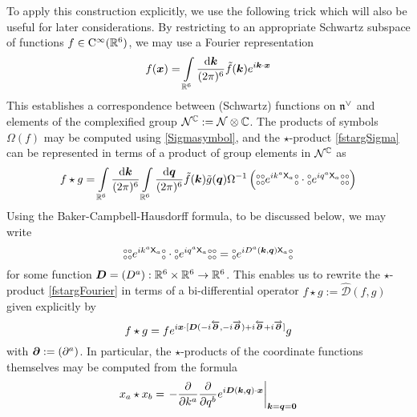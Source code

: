 To apply this construction explicitly, we use the following trick
\cite{MSSW1,BehrSyk1} which will also be useful for later considerations. By
restricting to an appropriate Schwartz subspace of functions
$f\in{\rm C}^\infty({\mathbb R}^6)$, we may use a Fourier representation
\begin{equation}
  \label{Fouriertransfdef}
  f(\mx)=\int\limits_{\R^6}\frac{\dd\mk}{(2\pi)^6} \tilde f(\mk) 
  e^{ i\mk\cdot\mx}
\end{equation}
This establishes a correspondence between (Schwartz) functions on ${\mathfrak n}^\vee$ and
elements of the complexified group $\mathcal{N}^{\mathbb C}:=
\mathcal{N}\otimes{\mathbb C}$. The products of symbols $\Omega(f)$ may be computed
using \eqref{Sigmasymbol}, and the $\star$-product \eqref{fstargSigma} can be
represented in terms of a product of group elements in $\mathcal{N}^{\mathbb C}$ as
\begin{equation}
  \label{fstargFourier}
  f\star g=\int\limits_{\R^6}\frac{\dd\mk}{(2\pi)^6} 
  \int\limits_{\R^6}\frac{\dd\mq}{(2\pi)^6} \tilde f(\mk) 
  \tilde g(\mq) \Omega^{-1}\left( \NO  \NO  e^{ i k^a \X_a} \NO\cdot
    \NO  e^{ i q^a \X_a} \NO  \NO \right)
\end{equation}
Using the Baker-Campbell-Hausdorff formula, to be discussed below, we
may write
\begin{equation}
  \label{NOproductsBCH}
  \NO  \NO  e^{ i k^a \X_a} \NO\cdot\NO  e^{ i q^a \X_a} \NO  \NO=
  \NO  e^{ i D^a(\mk,\mq) \X_a} \NO
\end{equation}
for some function ${{\boldsymbol {D} }}=(D^a):{\mathbb R}^6\times{\mathbb R}^6\to{\mathbb R}^6$. This enables us to
rewrite the $\star$-product \eqref{fstargFourier} in terms of a bi-differential
operator $f\star g:=\hat{\mathcal{D}}(f,g)$ given explicitly by
\begin{equation}
  \label{fstargbidiff}
  f\star g=f  e^{ i\mx\cdot[\mD( - i\overleftarrow{\bfd}
    , - i\overrightarrow{\bfd} )+ i\overleftarrow{\bfd}+ i
    \overrightarrow{\bfd} ]} g
\end{equation}
with ${{\boldsymbol {\partial} }}:=(\partial^a)$. In particular, the $\star$-products of the coordinate
functions themselves may be computed from the formula
\begin{equation}
  \label{xastarxb}
  x_a\star x_b=\left.-\frac{\d}{\d k^a}\frac\d
    {\d q^b} e^{ i\mD(\mk,\mq)\cdot\mx}\right|_{\mk=\mq=\mbf0}
\end{equation}

